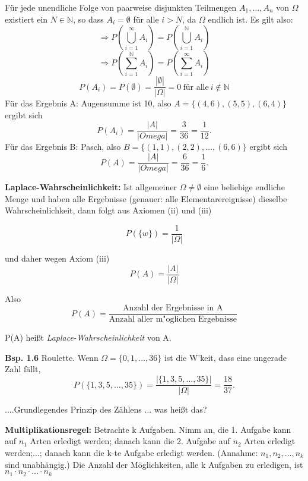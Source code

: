 \documentclass[a4paper,11pt]{article}
\begin{document}
\vspace{2pt}
\noindent Für jede unendliche Folge von paarweise disjunkten Teilmengen $A_1,\dots,A_n$ von $\Omega$ existiert ein $N\in\mathbb{N}$, so dass $A_i=\emptyset$ für alle $i>N$, da $\Omega$ endlich ist.
Es gilt also:
\[\Rightarrow P(\bigcup_{i=1}^{\infty}A_i)=P(\bigcup_{i=1}^{\mathbb{N}}A_i)\]
\[\Rightarrow P(\sum_{i=1}^{\mathbb{N}}A_i)=P(\sum_{i=1}^{\infty}A_i)\]
\[P(A_i)=P(\emptyset)=\frac{|\emptyset|}{|\Omega|}=0\ \text{für alle}\ i\notin\mathbb{N}\]
\newline Für das Ergebnis A: \glqq Augensumme ist 10\grqq, also $A=\{(4,6),(5,5),(6,4)\}$ ergibt sich \[P(A_i)=\frac{|A|}{|Omega|}=\frac{3}{36}=\frac{1}{12}.\]
\newline Für das Ergebnis B: \glqq Pasch\grqq, also $B=\{(1,1),(2,2),\dots,(6,6)\}$ ergibt sich 
\[P(A)=\frac{|A|}{|Omega|}=\frac{6}{36}=\frac{1}{6}.\]


\vspace{6pt}
\noindent\textbf{Laplace-Wahrscheinlichkeit:} Ist allgemeiner $\Omega \neq \emptyset$ eine beliebige endliche Menge und haben alle Ergebnisse 
(genauer: alle Elementarereignisse) dieselbe Wahrscheinlichkeit, dann folgt aus Axiomen (ii) und (iii)

\[ P(\{w\})=\frac{1}{|\Omega|} \]

\noindent und daher wegen Axiom (iii) \[ P(A)=\frac{|A|}{|\Omega|} \]

\noindent Also \[ P(A)=\frac{\text{Anzahl der Ergebnisse in A}}{\text{Anzahl aller m"oglichen Ergebnisse}} \] 

\noindent P(A) heißt \textit{Laplace-Wahrscheinlichkeit} von A.

\vspace{6pt}
\noindent\textbf{Bsp. 1.6} Roulette.
Wenn $\Omega = \{0,1,\dots,36\} $ ist die W'keit, dass eine ungerade Zahl fällt, \[P(\{1,3,5,\dots,35\})=\frac{|\{1,3,5,\dots,35\}|}{|\Omega|} = \frac{18}{37}.\]

\noindent....Grundlegendes Prinzip des Zählens ... was heißt das?

\vspace{6pt}
\noindent\textbf{Multiplikationsregel:} Betrachte k Aufgaben. Nimm an, die 
1. Aufgabe kann auf $n_1$ Arten erledigt werden; danach kann die 
2. Aufgabe auf $n_2$ Arten erledigt werden;$\dots$; danach kann die 
k-te Aufgabe erledigt werden. (Annahme: $n_1,n_2,\dots,n_k$ sind unabhängig.) 
\newline Die Anzahl der Möglichkeiten, alle k Aufgaben zu erledigen, ist $n_1\cdot n_2\cdot\dots\cdot n_k$
\end{document}
